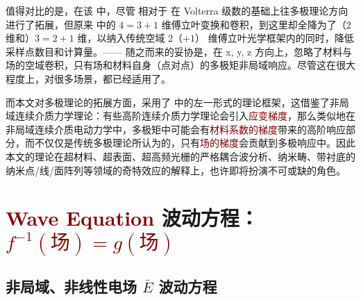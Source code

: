 值得对比的是，在该  中，尽管  相对于  在 Volterra 级数的基础上往多极理论方向进行了拓展，但原来  中的 $4=3+1$ 维傅立叶变换和卷积，到这里却全降为了（$2$ 维和）$3=2+1$ 维，以纳入传统空域 $2$（$+1$） 维傅立叶光学框架内的同时，降低采样点数目和计算量。—— 随之而来的妥协是，在 x, y, z 方向上，忽略了材料与场的空域卷积，只有场和材料自身（点对点）的多极矩非局域响应。尽管这在很大程度上，对很多场景，都已经适用了。

而本文对多极理论的拓展方面，采用了  中的左一形式的理论框架，这借鉴了非局域连续介质力学理论：有些高阶连续介质力学理论会引入\textcolor{Maroon}{应变梯度}\cite{LiuYingHuaGaoJieLianXuJieZhiLiLun2024}，那么类似地在非局域连续介质电动力学中，多极矩中可能会有\textcolor{Maroon}{材料系数的梯度}带来的高阶响应部分，而不仅仅是传统多极理论所认为的，只有\textcolor{Maroon}{场的梯度}会贡献到多极响应中。因此本文的理论在超材料、超表面、超高频光栅的严格耦合波分析、纳米畴、带衬底的纳米点/线/面阵列等领域的奇特效应的解释上，也许即将扮演不可或缺的角色。

\section{\textcolor{Maroon}{Wave Equation} 波动方程：\textcolor{Maroon}{$f^{-1}(\text{场}) = g(\text{场})$}}\label{sec:waveq}

\subsection{非局域、非线性电场 $\bar{E}$ 波动方程}\label{ssec:E-waveq}

